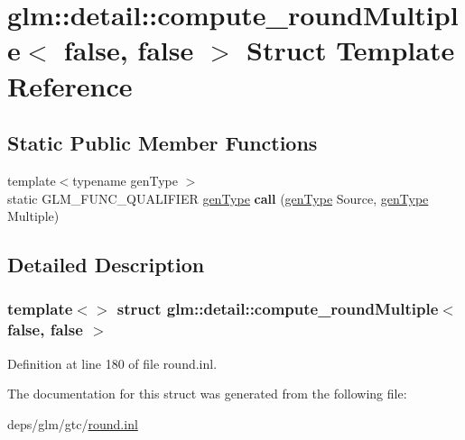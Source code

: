 \hypertarget{structglm_1_1detail_1_1compute__roundMultiple_3_01false_00_01false_01_4}{}\section{glm\+:\+:detail\+:\+:compute\+\_\+round\+Multiple$<$ false, false $>$ Struct Template Reference}
\label{structglm_1_1detail_1_1compute__roundMultiple_3_01false_00_01false_01_4}
\subsection*{Static Public Member Functions}
\begin{DoxyCompactItemize}
\item 
\mbox{\label{structglm_1_1detail_1_1compute__roundMultiple_3_01false_00_01false_01_4_a9242ffccd610779b8020ad382d47213a}} 
{\footnotesize template$<$typename gen\+Type $>$ }\\static G\+L\+M\+\_\+\+F\+U\+N\+C\+\_\+\+Q\+U\+A\+L\+I\+F\+I\+ER \hyperlink{structglm_1_1detail_1_1genType}{gen\+Type} {\bfseries call} (\hyperlink{structglm_1_1detail_1_1genType}{gen\+Type} Source, \hyperlink{structglm_1_1detail_1_1genType}{gen\+Type} Multiple)
\end{DoxyCompactItemize}


\subsection{Detailed Description}
\subsubsection*{template$<$$>$\newline
struct glm\+::detail\+::compute\+\_\+round\+Multiple$<$ false, false $>$}



Definition at line 180 of file round.\+inl.



The documentation for this struct was generated from the following file\+:\begin{DoxyCompactItemize}
\item 
deps/glm/gtc/\hyperlink{round_8inl}{round.\+inl}\end{DoxyCompactItemize}
